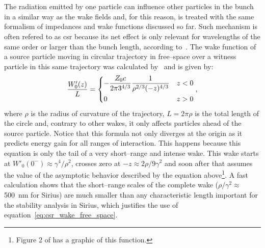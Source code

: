 \section{}\label{sec:csr_impedance}

    The radiation emitted by one particle can influence other particles in the bunch in a similar way as the wake fields and, for this reason, is treated with the same formalism of impedances and wake functions discussed so far. Such mechanism is often refered to as \gls{csr} because its net effect is only relevant for wavelengths of the same order or larger than the bunch length, according to~. The wake function of a source particle moving in circular trajectory in free--space over a witness particle in this same trajectory was calculated by~ and is given by:
    \begin{align}\label{eq:csr_wake_free_space}
        \frac{W'_0(z)}{L} =
        \begin{dcases}
            -\frac{Z_0 c}{2 \pi 3^{4/3}} \frac{1}{\rho^{2/3}(-z)^{4/3}} & z<0\\
            0 & z>0
        \end{dcases},
    \end{align}
    where $\rho$ is the radius of curvature of the trajectory, $L=2\pi\rho$ is the total length of the circle and, contrary to other wakes, it only affects particles ahead of the source particle. Notice that this formula not only diverges at the origin as it predicts energy gain for all ranges of interaction. This happens because this equation is only the tail of a very short--range and intense wake. This wake starts at $W'_0(0^-)\approx\gamma^4/\rho^2$, crosses zero at $-z\approx 2\rho / 9\gamma^2$ and soon after that assumes the value of the asymptotic behavior described by the equation above\footnote{Figure 2 of   has a graphic of this function.}. A fast calculation shows that the short--range scales of the complete wake ($\rho/\gamma^2 \approx $\SI{500}{\nano\meter} for Sirius) are much smaller than any characteristic length important for the stability analysis in Sirius, which justifies the use of equation~\eqref{eq:csr_wake_free_space}.

